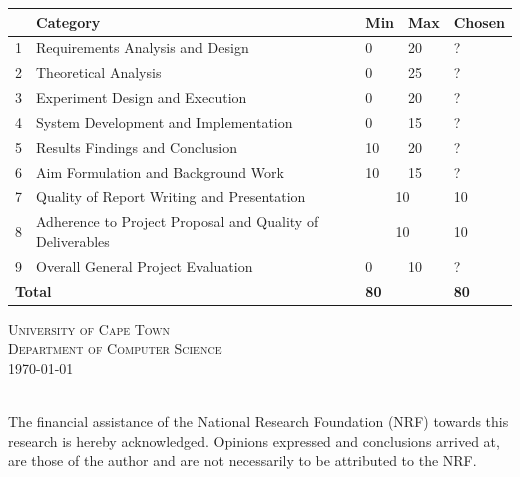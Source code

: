\begin{titlepage}
\begin{center}
\vfill
\begin{table}[h]
\centering
\begin{tabular}{|l|p{7.5cm}|l|l|l|}
\hline
& \textbf{Category} & \textbf{Min} & \textbf{Max} & \textbf{Chosen} \\
\hline
1 & Requirements Analysis and Design & 0 & 20 & ? \\
\hline
2 & Theoretical Analysis & 0 & 25 & ? \\
\hline
3 & Experiment Design and Execution & 0 & 20 & ? \\
\hline
4 & System Development and Implementation & 0 & 15 & ? \\
\hline
5 & Results Findings and Conclusion & 10 & 20 & ? \\
\hline
6 & Aim Formulation and Background Work & 10 & 15 & ? \\
\hline
7 & Quality of Report Writing and Presentation &
\multicolumn{2}{|c|}{10}  & 10 \\
\hline
8 & Adherence to Project Proposal and Quality of Deliverables &
\multicolumn{2}{|c|}{10}  & 10 \\
\hline
9 & Overall General Project Evaluation & 0 & 10 & ? \\
\hline
\multicolumn{2}{|l|}{\textbf{Total}} & \multicolumn{2}{|l|}{\textbf{80}} & \textbf{80} \\
\hline
\end{tabular}
\end{table}




\textsc{\Large University of Cape Town}\\[0.5cm]
\textsc{\Large Department of Computer Science}\\[0.5cm]
{\large \today} \\
\end{center}
\HRule \\[0.2cm]
{\raggedleft The financial assistance of the National Research Foundation (NRF) towards this research is hereby acknowledged. Opinions
expressed and conclusions arrived at, are those of the author and are not necessarily to be attributed to the NRF.}\\
\HRule \\[0.2cm]



\end{titlepage}
